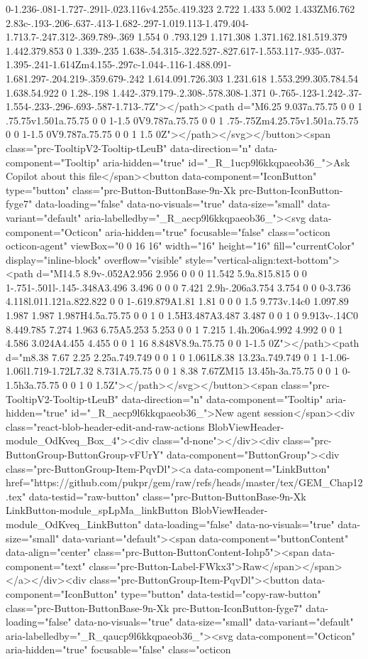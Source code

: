 0-1.236-.081-1.727-.291l-.023.116v4.255c.419.323 2.722 1.433 5.002 1.433ZM6.762 2.83c-.193-.206-.637-.413-1.682-.297-1.019.113-1.479.404-1.713.7-.247.312-.369.789-.369 1.554 0 .793.129 1.171.308 1.371.162.181.519.379 1.442.379.853 0 1.339-.235 1.638-.54.315-.322.527-.827.617-1.553.117-.935-.037-1.395-.241-1.614Zm4.155-.297c-1.044-.116-1.488.091-1.681.297-.204.219-.359.679-.242 1.614.091.726.303 1.231.618 1.553.299.305.784.54 1.638.54.922 0 1.28-.198 1.442-.379.179-.2.308-.578.308-1.371 0-.765-.123-1.242-.37-1.554-.233-.296-.693-.587-1.713-.7Z"></path><path d="M6.25 9.037a.75.75 0 0 1 .75.75v1.501a.75.75 0 0 1-1.5 0V9.787a.75.75 0 0 1 .75-.75Zm4.25.75v1.501a.75.75 0 0 1-1.5 0V9.787a.75.75 0 0 1 1.5 0Z"></path></svg></button><span class="prc-TooltipV2-Tooltip-tLeuB" data-direction="n" data-component="Tooltip" aria-hidden="true" id="_R_1ucp9l6kkqpaeob36_">Ask Copilot about this file</span><button data-component="IconButton" type="button" class="prc-Button-ButtonBase-9n-Xk prc-Button-IconButton-fyge7" data-loading="false" data-no-visuals="true" data-size="small" data-variant="default" aria-labelledby="_R_aecp9l6kkqpaeob36_"><svg data-component="Octicon" aria-hidden="true" focusable="false" class="octicon octicon-agent" viewBox="0 0 16 16" width="16" height="16" fill="currentColor" display="inline-block" overflow="visible" style="vertical-align:text-bottom"><path d="M14.5 8.9v-.052A2.956 2.956 0 0 0 11.542 5.9a.815.815 0 0 1-.751-.501l-.145-.348A3.496 3.496 0 0 0 7.421 2.9h-.206a3.754 3.754 0 0 0-3.736 4.118l.011.121a.822.822 0 0 1-.619.879A1.81 1.81 0 0 0 1.5 9.773v.14c0 1.097.89 1.987 1.987 1.987H4.5a.75.75 0 0 1 0 1.5H3.487A3.487 3.487 0 0 1 0 9.913v-.14C0 8.449.785 7.274 1.963 6.75A5.253 5.253 0 0 1 7.215 1.4h.206a4.992 4.992 0 0 1 4.586 3.024A4.455 4.455 0 0 1 16 8.848V8.9a.75.75 0 0 1-1.5 0Z"></path><path d="m8.38 7.67 2.25 2.25a.749.749 0 0 1 0 1.061L8.38 13.23a.749.749 0 1 1-1.06-1.06l1.719-1.72L7.32 8.731A.75.75 0 0 1 8.38 7.67ZM15 13.45h-3a.75.75 0 0 1 0-1.5h3a.75.75 0 0 1 0 1.5Z"></path></svg></button><span class="prc-TooltipV2-Tooltip-tLeuB" data-direction="n" data-component="Tooltip" aria-hidden="true" id="_R_aecp9l6kkqpaeob36_">New agent session</span><div class="react-blob-header-edit-and-raw-actions BlobViewHeader-module_OdKveq_Box_4"><div class="d-none"></div><div class="prc-ButtonGroup-ButtonGroup-vFUrY" data-component="ButtonGroup"><div class="prc-ButtonGroup-Item-PqvDl"><a data-component="LinkButton" href="https://github.com/pukpr/gem/raw/refs/heads/master/tex/GEM_Chap12.tex" data-testid="raw-button" class="prc-Button-ButtonBase-9n-Xk LinkButton-module_spLpMa_linkButton BlobViewHeader-module_OdKveq_LinkButton" data-loading="false" data-no-visuals="true" data-size="small" data-variant="default"><span data-component="buttonContent" data-align="center" class="prc-Button-ButtonContent-Iohp5"><span data-component="text" class="prc-Button-Label-FWkx3">Raw</span></span></a></div><div class="prc-ButtonGroup-Item-PqvDl"><button data-component="IconButton" type="button" data-testid="copy-raw-button" class="prc-Button-ButtonBase-9n-Xk prc-Button-IconButton-fyge7" data-loading="false" data-no-visuals="true" data-size="small" data-variant="default" aria-labelledby="_R_qaucp9l6kkqpaeob36_"><svg data-component="Octicon" aria-hidden="true" focusable="false" class="octicon 